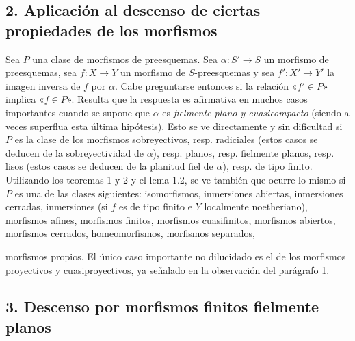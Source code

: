 \subsection*{2. Aplicación al descenso de ciertas propiedades de los morfismos}

Sea $P$ una clase de morfismos de preesquemas. Sea
$\alpha:S'\longrightarrow S$ un morfismo de preesquemas, sea
$f:X\longrightarrow Y$ un morfismo de $S$-preesquemas y sea
$f':X'\longrightarrow Y'$ la imagen inversa de $f$ por $\alpha$. Cabe
preguntarse entonces si la relación «$f'\in P$» implica «$f\in P$». Resulta que
la respuesta es afirmativa en muchos casos importantes cuando se supone que
$\alpha$ es \emph{fielmente plano y cuasicompacto} (siendo a veces superflua
esta última hipótesis). Esto se ve directamente y sin dificultad si $P$ es la
clase de los morfismos sobreyectivos, resp. radiciales (estos casos se deducen
de la sobreyectividad de $\alpha$), resp. planos, resp. fielmente planos, resp.
lisos (estos casos se deducen de la planitud fiel de $\alpha$), resp. de tipo
finito. Utilizando los teoremas 1 y 2 y el lema 1.2, se ve también que ocurre
lo mismo si $P$ es una de las clases siguientes: isomorfismos, inmersiones
abiertas, inmersiones cerradas, inmersiones (si $f$ es de tipo finito e $Y$
localmente noetheriano), morfismos afines, morfismos finitos, morfismos
cuasifinitos, morfismos abiertos, morfismos cerrados, homeomorfismos, morfismos
separados,

morfismos propios. El único caso importante no dilucidado es el de los
morfismos proyectivos y cuasiproyectivos, ya señalado en la observación del
parágrafo 1.

\subsection*{3. Descenso por morfismos finitos fielmente planos}

